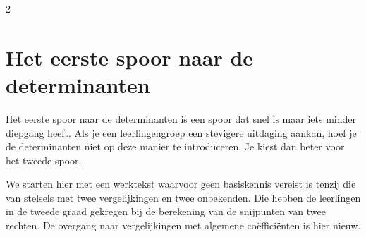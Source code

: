 \begin{multicols}{2}
\section{Het eerste spoor naar de determinanten}

Het eerste spoor naar de determinanten is een spoor dat snel is maar iets minder diepgang heeft. Als je een leerlingengroep een stevigere uitdaging aankan, hoef je de determinanten niet op deze manier te introduceren. Je kiest dan beter voor het tweede spoor.

We starten hier met een werktekst waarvoor geen basiskennis vereist is tenzij die van stelsels met twee vergelijkingen en twee onbekenden. Die hebben de leerlingen in de tweede graad gekregen bij de berekening van de snijpunten van twee rechten. De overgang naar vergelijkingen met algemene coëfficiënten is hier nieuw. 

\end{multicols}
